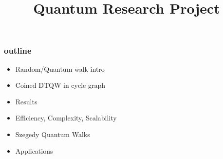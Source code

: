\documentclass{beamer}
\title{Quantum Research Project}
\begin{document}
\maketitle

\begin{frame}
    \frametitle{outline}
    \begin{itemize}
        \item Random/Quantum walk intro
        \item Coined DTQW in cycle graph 
        \item Results
        \item Efficiency, Complexity, Scalability
        \item Szegedy Quantum Walks
        \item Applications 
    \end{itemize}
\end{frame}
\end{document}
